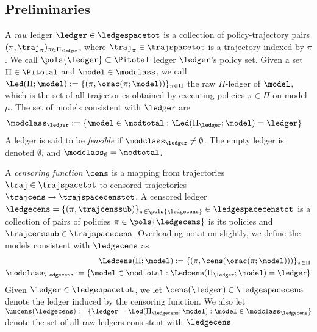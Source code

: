 \begin{example} 
\end{example}



\subsection{Preliminaries}

 A \emph{raw} ledger $\ledger \in \ledgespacetot$ is a collection of policy-trajectory pairs $(\pi,\traj_{\pi})_{\pi \in \Pi_{\ledger}}$, where $\traj_{\pi} \in \trajspacetot$ is a trajectory indexed by $\pi$. We call  $\pols{\ledger} \subset \Pitotal$ ledger $\ledger$'s policy set. Given a set $\Pi \in \Pitotal$ and $\model \in \modclass$, we call $\Led(\Pi;\model) := \{(\pi,\orac(\pi;\model))\}_{\pi \in \Pi}$  the raw $\Pi$-ledger of $\model$, which is the set of all trajectories obtained by executing policies $\pi \in \Pi$ on model $\mu$. The set of models consistent with $\ledger$ are
\begin{align}
  \modclass_{\ledger} &:= \{\model \in \modtotal : \Led(\Pi_{\ledger} ; \model) = \ledger \} \label{eq:modclass}
\end{align}
A ledger is said to be \emph{feasible} if $\modclass_{\ledger} \ne \emptyset$. The empty ledger is denoted $\emptyset$, and $\modclass_{\emptyset} = \modtotal$. 


A \emph{censoring function} $\cens$ is a mapping from trajectories  $\traj \in \trajspacetot$ to censored trajectories $\trajcens\to \trajspacecenstot$. A censored ledger $\ledgecens = \{(\pi,\trajcenssub)\}_{\pi \in \pols{\ledgecens}} \in \ledgespacecenstot $ is a collection of pairs of policies $\pi \in \pols{\ledgecens}$ is its policies and $\trajcenssub \in \trajspacecens$.  Overloading notation slightly, we define the models consistent with $\ledgecens$ as
\begin{align*}
\Ledcens(\Pi;\model) := \{(\pi,\cens(\orac(\pi;\model)))\}_{\pi \in \Pi}\\
\modclass_{\ledgecens} := \{\model \in \modtotal : \Ledcens(\Pi_{\ledger} ; \model) = \ledger \}
\end{align*}
Given $\ledger \in \ledgespacetot$, we let $\cens(\ledger) \in \ledgespacecens$ denote the ledger induced by the censoring function. We also let $\uncens(\ledgecens) := \{\ledger = \Led(\Pi_{\ledgecens};\model): \model \in \modclass_{\ledgecens}\}$ denote the set of all raw ledgers consistent with $\ledgecens$

